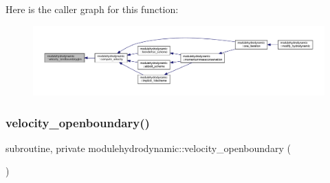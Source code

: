 Here is the caller graph for this function\+:\nopagebreak
\begin{figure}[H]
\begin{center}
\leavevmode
\includegraphics[width=350pt]{namespacemodulehydrodynamic_a678adb3cd056a0f44a4c7ba6b7ba8544_icgraph}
\end{center}
\end{figure}
\mbox{\label{namespacemodulehydrodynamic_ad3f40e56e615a729156e48c10775bde3}} 
\subsubsection{\texorpdfstring{velocity\+\_\+openboundary()}{velocity\_openboundary()}}
{\footnotesize\ttfamily subroutine, private modulehydrodynamic\+::velocity\+\_\+openboundary (\begin{DoxyParamCaption}{ }\end{DoxyParamCaption})\hspace{0.3cm}{\ttfamily [private]}}

